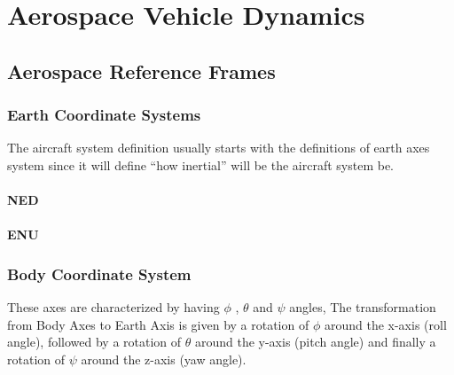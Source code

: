 \chapter{Aerospace Vehicle Dynamics}

\section{Aerospace Reference Frames}
\subsection{Earth Coordinate Systems}
The aircraft system definition usually starts with the definitions of earth axes
system since it will define ``how inertial'' will be the aircraft system be.
\subsubsection{NED}
\subsubsection{ENU}

\subsection{Body Coordinate System}
These axes are characterized by having $\phi$ , $\theta$ and $\psi$ angles,
The transformation from Body Axes to Earth Axis is given by a rotation of $\phi$ around
the x-axis (roll angle), followed by a rotation of $\theta$ around the y-axis (pitch angle)
and finally a rotation of $\psi$ around the z-axis (yaw angle).

